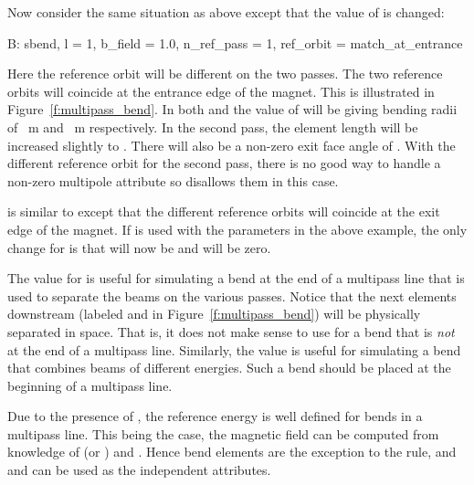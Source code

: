 Now consider the same situation as above except that the value of
 is changed:
\begin{example} 
  B: sbend, l = 1, b_field = 1.0, n_ref_pass = 1, ref_orbit = match_at_entrance
\end{example}
Here the reference orbit will be different on the two passes. The two
reference orbits will coincide at the entrance edge of the magnet.
This is illustrated in Figure~\ref{f:multipass_bend}. In both
 and  the value of  will be 
giving bending radii of ~m and ~m
respectively. In the second pass, the element length  will be
increased slightly to . There will also be a non-zero
exit face angle  of . With the different reference
orbit for the second pass, there is no good way to handle a non-zero
multipole attribute so \bmad disallows them in this case.

 is similar to  except that
the different reference orbits will coincide at the exit edge of the
magnet. If  is used with the parameters in the above
example, the only change for  is that  will now be
 and  will be zero.

The  value for  is useful
for simulating a bend at the end of a multipass line that is used to
separate the beams on the various passes. Notice that the next
elements downstream (labeled  and  in
Figure~\ref{f:multipass_bend}) will be physically separated in
space. That is, it does not make sense to use 
for a bend that is {\em not} at the end of a multipass
line. Similarly, the  value is useful for simulating
a bend that combines beams of different energies. Such a bend should
be placed at the beginning of a multipass line.

Due to the presence of , the reference energy is well
defined for bends in a multipass line. This being the case, the
magnetic field can be computed from knowledge of  (or )
and . Hence bend elements are the exception to the rule, and
 and  can be used as the independent attributes.
